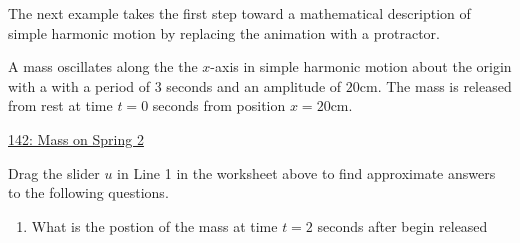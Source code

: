 \documentclass{ximera}
\begin{document}
The next example takes the first step toward a mathematical description of simple harmonic motion by replacing the animation with a protractor.

\begin{example}  \label{Ex:PDoEr3rdfsx}
A mass oscillates along the the $x$-axis in simple harmonic motion  about the origin  with a with a period of $3$ seconds and an amplitude of $20$cm. The mass is released from rest at time $t=0$ seconds from position $x=20$cm.

\begin{onlineOnly}
    \begin{center}
\end{center}
\end{onlineOnly}

\href{https://www.desmos.com/calculator/rqdenajviu}{142: Mass on Spring 2 }

Drag the slider $u$ in Line 1 in the worksheet above to find approximate answers to the following questions.

\begin{enumerate}
\item What is the postion of the mass at time $t=2$ seconds after begin released
\end{enumerate}


\end{example}
\end{document}

